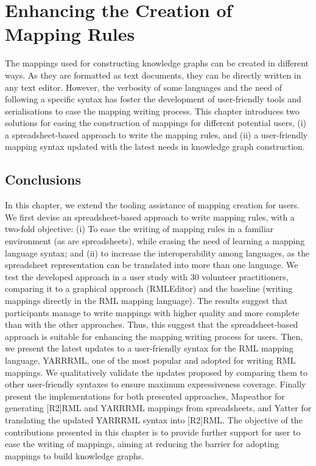 
\chapter{Enhancing the Creation of Mapping Rules}
\label{chapter:creation}

The mappings used for constructing knowledge graphs can be created in different ways. As they are formatted as text documents, they can be directly written in any text editor. However, the verbosity of some languages and the need of following a specific syntax has foster the development of user-friendly tools and serialisations to ease the mapping writing process. This chapter introduces two solutions for easing the construction of mappings for different potential users, (i) a spreadsheet-based approach to write the mapping rules, and (ii) a user-friendly mapping syntax updated with the latest needs in knowledge graph construction.





\section{Conclusions}

In this chapter, we extend the tooling assistance of mapping creation for users. We first devise an spreadsheet-based approach to write mapping rules, with a two-fold objective: (i) To ease the writing of mapping rules in a familiar environment (as are spreadsheets), while erasing the need of learning a mapping language syntax; and (ii) to increase the interoperability among languages, as the spreadsheet representation can be translated into more than one language. We test the developed approach in a user study with 30 volunteer practitioners, comparing it to a graphical approach (RMLEditor) and the baseline (writing mappings directly in the RML mapping language). The results suggest that participants manage to write mappings with higher quality and more complete than with the other approaches. Thus, this suggest that the spreadsheet-based approach is suitable for enhancing the mapping writing process for users. Then, we present the latest updates to a user-friendly syntax for the RML mapping language, YARRRML, one of the most popular and adopted for writing RML mappings. We qualitatively validate the updates proposed by comparing them to other user-friendly syntaxes to ensure maximum expressiveness coverage. Finally present the implementations for both presented approaches, Mapeathor for generating [R2]RML and YARRRML mappings from spreadsheets, and Yatter for translating the updated YARRRML syntax into [R2]RML. The objective of the contributions presented in this chapter is to provide further support for user to ease the writing of mappings, aiming at reducing the barrier for adopting mappings to build knowledge graphs. 